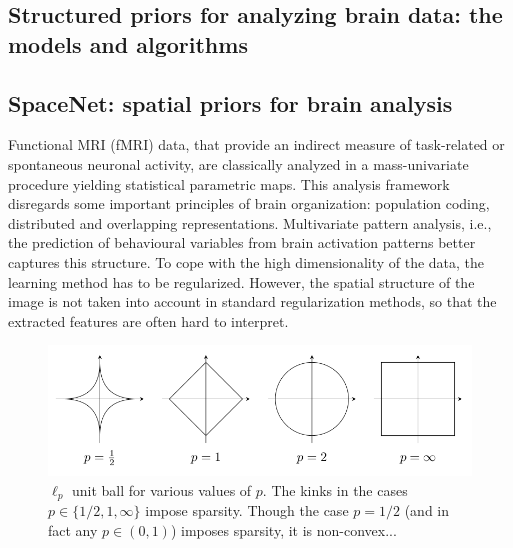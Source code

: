 \begin{fullwidth}
\chapter{Structured priors for analyzing brain data: the models and algorithms}\label{chap:hrf_estimation}
\end{fullwidth}

\section{SpaceNet: spatial priors for brain analysis}
Functional MRI (fMRI) data, that provide an indirect measure of task-related
or spontaneous neuronal activity, are classically analyzed
in a mass-univariate procedure yielding statistical parametric
maps. This analysis framework disregards some important principles
of brain organization: population coding, distributed and
overlapping representations. Multivariate pattern analysis, i.e.,
the prediction of behavioural variables from brain activation
patterns better captures this structure. To cope with the high
dimensionality of the data, the learning method has to be
regularized. However, the spatial structure of the image is not
taken into account in standard regularization methods, so that the
extracted features are often hard to interpret.

\begin{figure}[!htbp]
  \includegraphics[width=1\linewidth]{figures/balls.png}
  \caption{$\ell_p$ unit ball for various values of $p$. The kinks
    in the cases $p \in \{1/2,1,\infty\}$ impose sparsity. Though the
  case $p = 1/2$ (and in fact any $p \in (0, 1)$) imposes sparsity,
it is non-convex...}
\end{figure}


